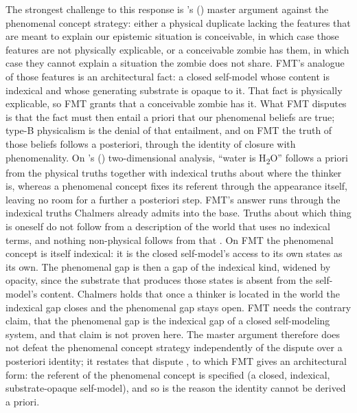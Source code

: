\documentclass[12pt]{article}
\begin{document}
{The strongest challenge to this response is \citeauthor{Chalmers2007}'s (\citeyear{Chalmers2007}) master argument against the phenomenal concept strategy: either a physical duplicate lacking the features that are meant to explain our epistemic situation is conceivable, in which case those features are not physically explicable, or a conceivable zombie has them, in which case they cannot explain a situation the zombie does not share. FMT's analogue of those features is an architectural fact: a closed self-model whose content is indexical and whose generating substrate is opaque to it. That fact is physically explicable, so FMT grants that a conceivable zombie has it. What FMT disputes is that the fact must then entail a priori that our phenomenal beliefs are true; type-B physicalism is the denial of that entailment, and on FMT the truth of those beliefs follows a posteriori, through the identity of closure with phenomenality. On \citeauthor{Chalmers1996}'s (\citeyear{Chalmers1996}) two-dimensional analysis, ``water is H\textsubscript{2}O'' follows a priori from the physical truths together with indexical truths about where the thinker is, whereas a phenomenal concept fixes its referent through the appearance itself, leaving no room for a further a posteriori step. FMT's answer runs through the indexical truths Chalmers already admits into the base. Truths about which thing is oneself do not follow from a description of the world that uses no indexical terms, and nothing non-physical follows from that \citep{Perry1979}. On FMT the phenomenal concept is itself indexical: it is the closed self-model's access to its own states as its own. The phenomenal gap is then a gap of the indexical kind, widened by opacity, since the substrate that produces those states is absent from the self-model's content. Chalmers holds that once a thinker is located in the world the indexical gap closes and the phenomenal gap stays open. FMT needs the contrary claim, that the phenomenal gap is the indexical gap of a closed self-modeling system, and that claim is not proven here. The master argument therefore does not defeat the phenomenal concept strategy independently of the dispute over a posteriori identity; it restates that dispute \citep[cf.][]{Balog2012}, to which FMT gives an architectural form: the referent of the phenomenal concept is specified (a closed, indexical, substrate-opaque self-model), and so is the reason the identity cannot be derived a priori.

}
\end{document}
